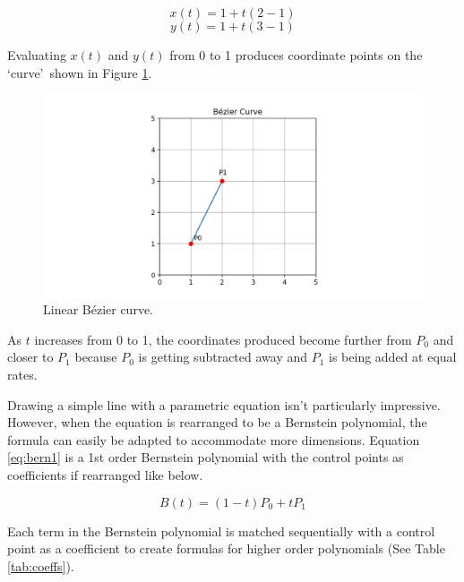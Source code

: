 \documentclass[12pt,letterpaper]{article}
\begin{document}
$$x(t) = 1 + t(2-1)$$
$$y(t) = 1 + t(3-1)$$

Evaluating $x(t)$ and $y(t)$ from 0 to 1 produces coordinate points on the \lq curve\rq \, shown in Figure \ref{fig:bez2}. 

\begin{figure}[H]
    \includegraphics[width=15cm]{Figure_3}
    \centering
    \caption{Linear B\'ezier curve.}
    \label{fig:bez2}
\end{figure}

As $t$ increases from 0 to 1, the coordinates produced become further from $P_0$ and closer to $P_1$ because $P_0$ is getting subtracted away and $P_1$ is being added at equal rates. 

Drawing a simple line with a parametric equation isn’t particularly impressive. However, when the equation is rearranged to be a Bernstein polynomial, the formula can easily be adapted to accommodate more dimensions. Equation \ref{eq:bern1} is a 1st order Bernstein polynomial with the control points as coefficients if rearranged like below.

\begin{equation}
    \label{eq:bern1}
    B(t) = (1-t)P_0 + t P_1
\end{equation}

Each term in the Bernstein polynomial is matched sequentially with a control point as a coefficient to create formulas for higher order polynomials (See Table \ref{tab:coeffs}).
\end{document}
